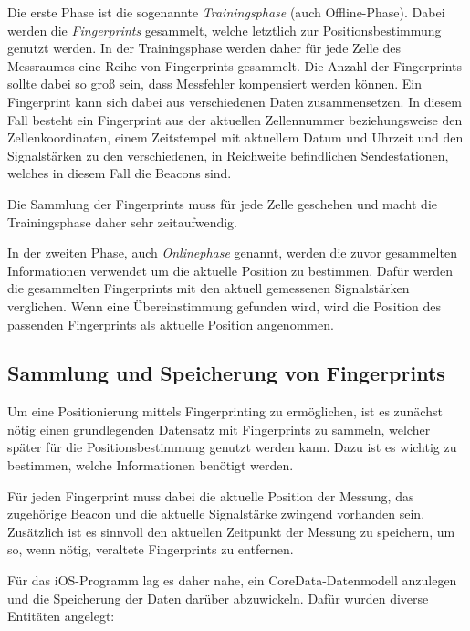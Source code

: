 Die erste Phase ist die sogenannte \emph{Trainingsphase} (auch Offline-Phase). Dabei werden die \emph{Fingerprints} gesammelt, welche letztlich zur Positionsbestimmung genutzt werden. 
In der Trainingsphase werden daher für jede Zelle des Messraumes eine Reihe von Fingerprints gesammelt. Die Anzahl der Fingerprints sollte dabei so groß sein, dass Messfehler kompensiert werden können. 
Ein Fingerprint kann sich dabei aus verschiedenen Daten zusammensetzen. 
In diesem Fall besteht ein Fingerprint aus der aktuellen Zellennummer beziehungsweise den Zellenkoordinaten, einem Zeitstempel mit aktuellem Datum und Uhrzeit und den Signalstärken zu den verschiedenen, in Reichweite befindlichen Sendestationen, welches in diesem Fall die Beacons sind.

Die Sammlung der Fingerprints muss für jede Zelle geschehen und macht die Trainingsphase daher sehr zeitaufwendig. 

In der zweiten Phase, auch \emph{Onlinephase} genannt, werden die zuvor gesammelten Informationen verwendet um die aktuelle Position zu bestimmen. 
Dafür werden die gesammelten Fingerprints mit den aktuell gemessenen Signalstärken verglichen. Wenn eine Übereinstimmung gefunden wird, wird die Position des passenden Fingerprints als aktuelle Position angenommen.


\subsection{Sammlung und Speicherung von Fingerprints}
\label{sec:implementation:fingerprinting:collecting}
Um eine Positionierung mittels Fingerprinting zu ermöglichen, ist es zunächst nötig einen grundlegenden Datensatz mit Fingerprints zu sammeln, welcher später für die Positionsbestimmung genutzt werden kann. Dazu ist es wichtig zu bestimmen, welche Informationen benötigt werden.

Für jeden Fingerprint muss dabei die aktuelle Position der Messung, das zugehörige Beacon und die aktuelle Signalstärke zwingend vorhanden sein.
Zusätzlich ist es sinnvoll den aktuellen Zeitpunkt der Messung zu speichern, um so, wenn nötig, veraltete Fingerprints zu entfernen. 

Für das iOS-Programm lag es daher nahe, ein CoreData-Datenmodell anzulegen und die Speicherung der Daten darüber abzuwickeln.
Dafür wurden diverse Entitäten angelegt:

